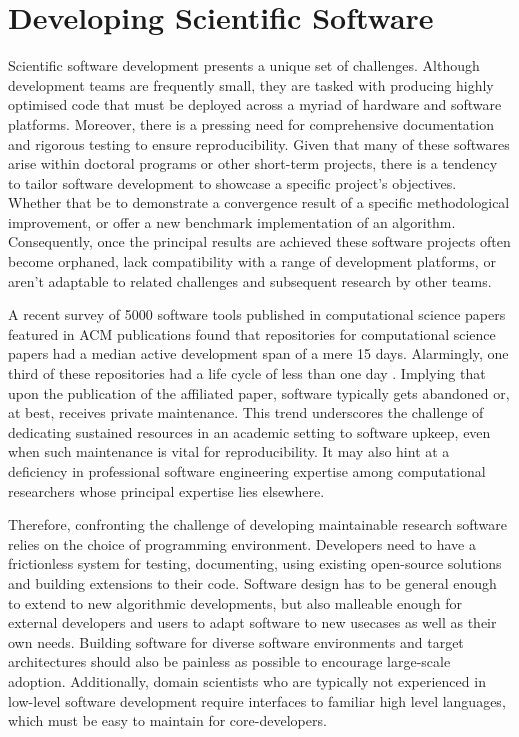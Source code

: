 \section{Developing Scientific Software}\label{chpt:1:sec:0}

Scientific software development presents a unique set of challenges. Although development teams are frequently small, they are tasked with producing highly optimised code that must be deployed across a myriad of hardware and software platforms. Moreover, there is a pressing need for comprehensive documentation and rigorous testing to ensure reproducibility. Given that many of these softwares arise within doctoral programs or other short-term projects, there is a tendency to tailor software development to showcase a specific project's objectives. Whether that be to demonstrate a convergence result of a specific methodological improvement, or offer a new benchmark implementation of an algorithm. Consequently, once the principal results are achieved these software projects often become orphaned, lack compatibility with a range of development platforms, or aren't adaptable to related challenges and subsequent research by other teams.

A recent survey of 5000 software tools published in computational science papers featured in ACM publications found that repositories for computational science papers had a median active development span of a mere 15 days. Alarmingly, one third of these repositories had a life cycle of less than one day \cite{hasselbring2020open}. Implying that upon the publication of the affiliated paper, software typically gets abandoned or, at best, receives private maintenance. This trend underscores the challenge of dedicating sustained resources in an academic setting to software upkeep, even when such maintenance is vital for reproducibility. It may also hint at a deficiency in professional software engineering expertise among computational researchers whose principal expertise lies elsewhere.

Therefore, confronting the challenge of developing maintainable research software relies on the choice of programming environment. Developers need to have a frictionless system for testing, documenting, using existing open-source solutions and building extensions to their code. Software design has to be general enough to extend to new algorithmic developments, but also malleable enough for external developers and users to adapt software to new usecases as well as their own needs. Building software for diverse software environments and target architectures should also be painless as possible to encourage large-scale adoption. Additionally, domain scientists who are typically not experienced in low-level software development require interfaces to familiar high level languages, which must be easy to maintain for core-developers.

